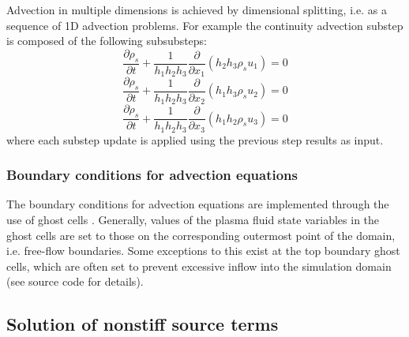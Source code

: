 \documentclass[11pt,letterpaper]{article}
\begin{document}
Advection in multiple dimensions is achieved by dimensional splitting, i.e. as a sequence of 1D advection problems.  For example the continuity advection substep is composed of the following subsubsteps:
\begin{equation}
\frac{\partial \rho_s}{\partial t} + \frac{1}{h_1 h_2 h_3} \frac{\partial}{\partial x_1} \left( h_2 h_3 \rho_s u_1 \right)  = 0
\end{equation}
\begin{equation}
\frac{\partial \rho_s}{\partial t} + \frac{1}{h_1 h_2 h_3} \frac{\partial}{\partial x_2} \left( h_1 h_3 \rho_s u_2 \right)  = 0
\end{equation}
\begin{equation}
\frac{\partial \rho_s}{\partial t} + \frac{1}{h_1 h_2 h_3} \frac{\partial}{\partial x_3} \left( h_1 h_2 \rho_s u_3 \right) = 0
\end{equation}
where each substep update is applied using the previous step results as input.


\subsubsection{Boundary conditions for advection equations}

The boundary conditions for advection equations are implemented through the use of ghost cells \citep{Leveque:2002}.  Generally, values of the plasma fluid state variables in the ghost cells are set to those on the corresponding outermost point of the domain, i.e. free-flow boundaries.  Some exceptions to this exist at the top boundary ghost cells, which are often set to prevent excessive inflow into the simulation domain (see source code for details).  

\subsection{Solution of nonstiff source terms}
\end{document}
